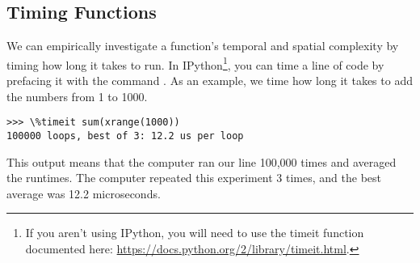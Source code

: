 \subsection*{Timing Functions}
We can empirically investigate a function's temporal and spatial complexity by timing how long it takes to run.
In IPython\footnote{If you aren't using IPython, you will need
to use the timeit function documented here: \url{https://docs.python.org/2/library/timeit.html}.}, you can time a line of code by prefacing it with the command .
As an example, we time how long it takes to add the numbers from 1 to 1000.
\begin{lstlisting}
>>> \%timeit sum(xrange(1000))
100000 loops, best of 3: 12.2 us per loop
\end{lstlisting}
This output means that the computer ran our line 100,000 times and averaged the runtimes.
The computer repeated this experiment 3 times, and the best average was 12.2 microseconds.

